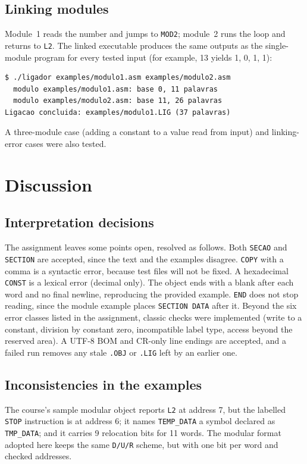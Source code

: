\documentclass[conference]{IEEEtran}
\begin{document}
\subsection{Linking modules}
Module~1 reads the number and jumps to \texttt{MOD2}; module~2 runs the loop and returns to \texttt{L2}. The linked executable produces the same outputs as the single-module program for every tested input (for example, 13 yields 1, 0, 1, 1):
\begin{lstlisting}
$ ./ligador examples/modulo1.asm examples/modulo2.asm
  modulo examples/modulo1.asm: base 0, 11 palavras
  modulo examples/modulo2.asm: base 11, 26 palavras
Ligacao concluida: examples/modulo1.LIG (37 palavras)
\end{lstlisting}
A three-module case (adding a constant to a value read from input) and linking-error cases were also tested.

\section{Discussion}
\subsection{Interpretation decisions}
The assignment leaves some points open, resolved as follows. Both \texttt{SECAO} and \texttt{SECTION} are accepted, since the text and the examples disagree. \texttt{COPY} with a comma is a syntactic error, because test files will not be fixed. A hexadecimal \texttt{CONST} is a lexical error (decimal only). The object ends with a blank after each word and no final newline, reproducing the provided example. \texttt{END} does not stop reading, since the module example places \texttt{SECTION DATA} after it. Beyond the six error classes listed in the assignment, classic checks were implemented (write to a constant, division by constant zero, incompatible label type, access beyond the reserved area). A UTF-8 BOM and CR-only line endings are accepted, and a failed run removes any stale \texttt{.OBJ} or \texttt{.LIG} left by an earlier one.

\subsection{Inconsistencies in the examples}
The course's sample modular object reports \texttt{L2} at address 7, but the labelled \texttt{STOP} instruction is at address 6; it names \texttt{TEMP\_DATA} a symbol declared as \texttt{TMP\_DATA}; and it carries 9 relocation bits for 11 words. The modular format adopted here keeps the same \texttt{D/U/R} scheme, but with one bit per word and checked addresses.
\end{document}
